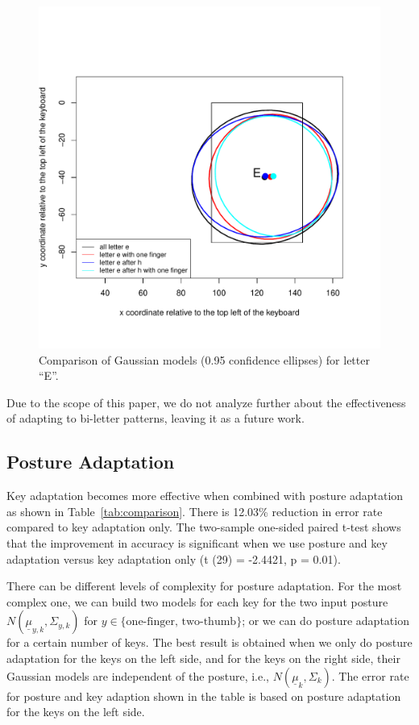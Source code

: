 \documentclass{sigchi}
\begin{document}
\begin{figure}[tb]
  \centering
  \includegraphics[width=0.9\columnwidth]{figures/biletter-he.pdf}
  \caption{Comparison of Gaussian models (0.95 confidence ellipses) for letter
    ``E''.}
  \label{fig:biletter}
\end{figure}

Due to the scope of this paper, we do not analyze further about the
effectiveness of adapting to bi-letter patterns, leaving it as a future
work.

\subsection{Posture Adaptation}
Key adaptation becomes more effective when combined with posture adaptation as
shown in Table~\ref{tab:comparison}. There is 12.03\% reduction in error rate 
compared to key adaptation only. The two-sample one-sided paired t-test shows
that the improvement in accuracy is significant when we use posture and key 
adaptation versus key adaptation only (t (29) = -2.4421, p = 0.01).

There can be different levels of complexity for posture adaptation. For the most complex one, we can build two models for each key for the 
two input posture $N(\underline \mu_{y,k}, \Sigma_{y,k})$ for $y \in
\{\text{one-finger, two-thumb}\}$; or we can do posture adaptation for a certain
number of keys.
The best result is obtained when we only do posture adaptation for the keys on 
the left side, and for the keys on the right side, their Gaussian models are
independent of the posture, i.e., $N(\underline\mu_k, \Sigma_k)$.
The error rate for posture and key adaption shown in the table is based on 
posture adaptation for the keys on the left side. 
\end{document}

